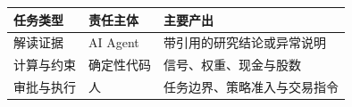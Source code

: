 \begin{tabular}{@{}P{3.0cm}P{4.6cm}P{4.9cm}@{}}
\toprule
\textbf{任务类型} & \textbf{责任主体} & \textbf{主要产出} \\
\midrule
解读证据 & AI Agent & 带引用的研究结论或异常说明 \\
计算与约束 & 确定性代码 & 信号、权重、现金与股数 \\
审批与执行 & 人 & 任务边界、策略准入与交易指令 \\
\bottomrule
\end{tabular}
